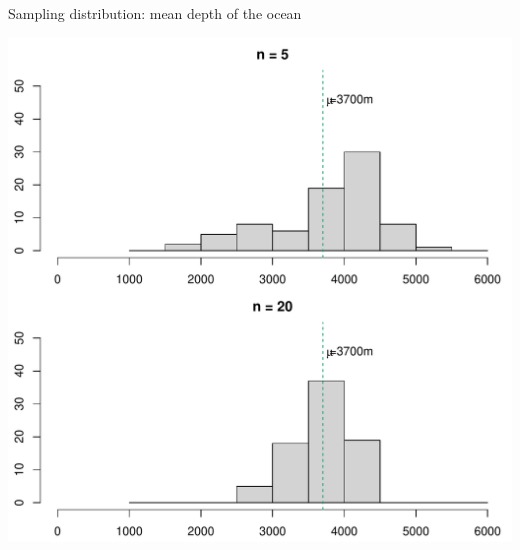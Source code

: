 \documentclass[10pt]{beamer}\usepackage[]{graphicx}\usepackage[]{color}
\makeatletter
\def\maxwidth{ %
  \ifdim\Gin@nat@width>\linewidth
    \linewidth
  \else
    \Gin@nat@width
  \fi
}
\newenvironment{knitrout}{}{} %
\makeatother
\begin{document}
\begin{frame}[fragile]{Sampling distribution: mean depth of the ocean}
	
	
\begin{knitrout}\tiny
{}\color{fgcolor}

{\centering \includegraphics[width=\maxwidth]{figure/unnamed-chunk-5-1} 

}



\end{knitrout}
	
\end{frame}
\end{document}
